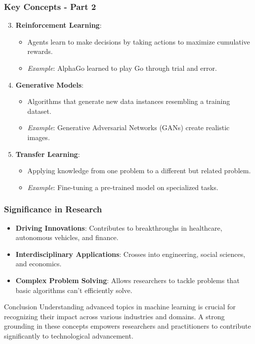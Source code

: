 \documentclass[aspectratio=169]{beamer}
\begin{document}
\begin{frame}[fragile]
    \frametitle{Key Concepts - Part 2}
    
    \begin{enumerate}
        \setcounter{enumi}{2} %
        
        \item \textbf{Reinforcement Learning}:
        \begin{itemize}
            \item Agents learn to make decisions by taking actions to maximize cumulative rewards.
            \item \textit{Example}: AlphaGo learned to play Go through trial and error.
        \end{itemize}
        
        \item \textbf{Generative Models}:
        \begin{itemize}
            \item Algorithms that generate new data instances resembling a training dataset.
            \item \textit{Example}: Generative Adversarial Networks (GANs) create realistic images.
        \end{itemize}
        
        \item \textbf{Transfer Learning}:
        \begin{itemize}
            \item Applying knowledge from one problem to a different but related problem.
            \item \textit{Example}: Fine-tuning a pre-trained model on specialized tasks.
        \end{itemize}
    \end{enumerate}
\end{frame}

\begin{frame}[fragile]
    \frametitle{Significance in Research}

    \begin{itemize}
        \item \textbf{Driving Innovations}: Contributes to breakthroughs in healthcare, autonomous vehicles, and finance.
        \item \textbf{Interdisciplinary Applications}: Crosses into engineering, social sciences, and economics.
        \item \textbf{Complex Problem Solving}: Allows researchers to tackle problems that basic algorithms can't efficiently solve.
    \end{itemize}
    
    \begin{block}{Conclusion}
        Understanding advanced topics in machine learning is crucial for recognizing their impact across various industries and domains. A strong grounding in these concepts empowers researchers and practitioners to contribute significantly to technological advancement.
    \end{block}
\end{frame}
\end{document}
